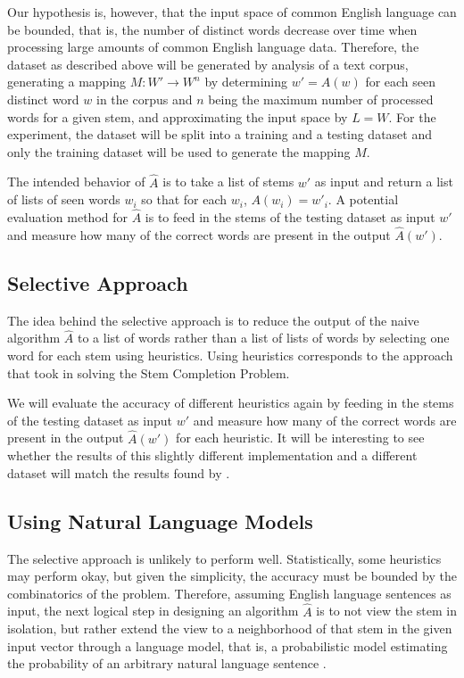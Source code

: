 \documentclass[11pt]{article}
\begin{document}
Our hypothesis is, however, that the input space of common English language can be bounded, that is, the number of distinct words decrease over time when processing large amounts of common English language data. Therefore, the dataset as described above will be generated by analysis of a text corpus, generating a mapping $M:W'\rightarrow W^n$ by determining $w'=A(w)$ for each seen distinct word $w$ in the corpus and $n$ being the maximum number of processed words for a given stem, and approximating the input space by $L=W$. For the experiment, the dataset will be split into a training and a testing dataset and only the training dataset will be used to generate the mapping $M$.

The intended behavior of $\hat{A}$ is to take a list of stems $w'$ as input and return a list of lists of seen words $w_i$ so that for each $w_i$, $A(w_i)=w'_i$. A potential evaluation method for $\hat{A}$ is to feed in the stems of the testing dataset as input $w'$ and measure how many of the correct words are present in the output $\hat{A}(w')$.

\subsection{Selective Approach}

The idea behind the selective approach is to reduce the output of the naive algorithm $\hat{A}$ to a list of words rather than a list of lists of words by selecting one word for each stem using heuristics. Using heuristics corresponds to the approach that \cite{Feinerer2010} took in solving the Stem Completion Problem.

We will evaluate the accuracy of different heuristics again by feeding in the stems of the testing dataset as input $w'$ and measure how many of the correct words are present in the output $\hat{A}(w')$ for each heuristic. It will be interesting to see whether the results of this slightly different implementation and a different dataset will match the results found by \cite{Feinerer2010}.

\subsection{Using Natural Language Models}

The selective approach is unlikely to perform well. Statistically, some heuristics may perform okay, but given the simplicity, the accuracy must be bounded by the combinatorics of the problem. Therefore, assuming English language sentences as input, the next logical step in designing an algorithm $\hat{A}$ is to not view the stem in isolation, but rather extend the view to a neighborhood of that stem in the given input vector through a language model, that is, a probabilistic model estimating the probability of an arbitrary natural language sentence \citep{vlado}.
\end{document}
